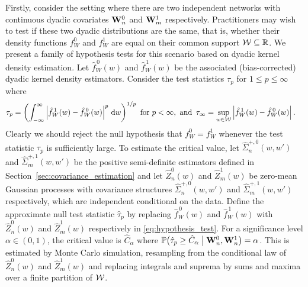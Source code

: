 Firstly, consider the setting where there are
two independent networks with
continuous dyadic covariates $\mathbf{W}_n^0$ and $\mathbf{W}_m^1$ respectively.
Practitioners may wish to test if these two dyadic distributions
are the same, that is, whether their density functions
$f_W^0$ and $f_W^1$ are equal on their
common support $\mathcal{W} \subseteq \mathbb{R}$.
We present a family of hypothesis tests for this scenario
based on dyadic kernel density estimation.
Let $\hat f_W^{\,0}(w)$ and $\hat f_W^{\,1}(w)$
be the associated
(bias-corrected) dyadic kernel density estimators.
Consider the test statistics
$\tau_p$ for $1 \leq p \leq \infty$ where
%
\begin{align}
  \label{eq:hypothesis_test}
  \tau_p
  &=
  \left(
    \int_{-\infty}^{\infty}
    \left|
    \hat f_W^{\,1}(w)
    - \hat f_W^{\,0}(w)
    \right|^p
    \,\mathrm{d}w
  \right)^{1/p}
  \text{ for } p < \infty, \text{ and }\,
  \tau_\infty
  = \sup_{w \in \mathcal{W}}
  \left|
  \hat f_W^{\,1}(w)
  - \hat f_W^{\,0}(w)
  \right|.
\end{align}
%
Clearly we should reject the null hypothesis that $f_W^0 = f_W^1$ whenever
the test statistic $\tau_p$ is sufficiently large.
To estimate the critical value, let
$\hat\Sigma_n^{+,0}(w, w')$ and $\hat\Sigma_m^{+,1}(w, w')$
be the positive semi-definite estimators defined in
Section~\ref{sec:covariance_estimation} and
let $\hat Z^0_n(w)$ and $\hat Z^1_m(w)$ be zero-mean
Gaussian processes with covariance
structures $\hat\Sigma_n^{+,0}(w, w')$
and $\hat\Sigma_m^{+,1}(w, w')$
respectively, which are independent conditional on the data.
Define the approximate null test statistic
$\hat \tau_p$ by replacing
$\hat f_W^{\,0}(w)$ and $\hat f_W^{\,1}(w)$
with $\hat Z^0_n(w)$ and $\hat Z^1_m(w)$ respectively
in \eqref{eq:hypothesis_test}.
For a significance level $\alpha \in (0,1)$,
the critical value is $\hat C_\alpha$ where
%
$\mathbb{P} \big(
  \hat \tau_p \geq \hat C_\alpha \bigm\vert \mathbf{W}_n^0, \mathbf{W}_n^1
\big) = \alpha$.
%
This is estimated by Monte Carlo simulation, resampling
from the conditional law of
$\hat Z^0_n(w)$ and $\hat Z^1_m(w)$
and replacing integrals and suprema by sums and maxima over a
finite partition of $\mathcal{W}$.

